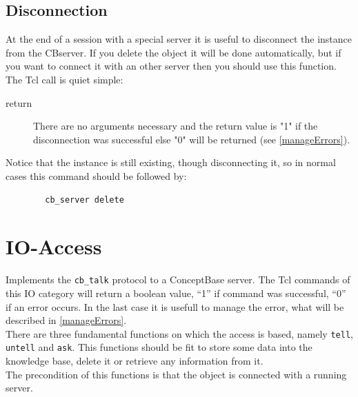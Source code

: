  \subsection{Disconnection}
	At the end of a session with a special server it is useful to
	 disconnect the instance from the CBserver.
	If you delete the object it will be done automatically,
	 but if you want to connect it with an other server 
	 then you should use this function.
	The Tcl call is quiet simple: \\
	\begin{method}{ } 
	  \begin{description}
	   \item[ return] There are no arguments necessary and 
		the return value is "1" if the disconnection was successful
	 	else "0" will be returned (see \ref{manageErrors}).
	  \end{description}
	Notice that the instance is still existing,
	 though disconnecting it, so in normal cases this
	 command should be followed by: 
	 \begin{verbatim}
		cb_server delete
	 \end{verbatim}
	\end{method}

\section{IO-Access}
	Implements the {\tt cb\_talk} protocol to a ConceptBase server.
	The Tcl commands of this IO category will return a boolean value,
  	 ``1'' if command was successful, ``0'' if an error occurs.
  	In the last case it is usefull to manage the error, 
	 what will be described in \ref{manageErrors}. \\
	There are three fundamental functions on which the access is based,
	namely {\tt tell}, {\tt untell} and {\tt ask}.
	This functions should be fit to store some data into the 
	 knowledge base, delete it or retrieve any information from it. \\
	The precondition of this functions is that the object is connected
	 with a running server.
